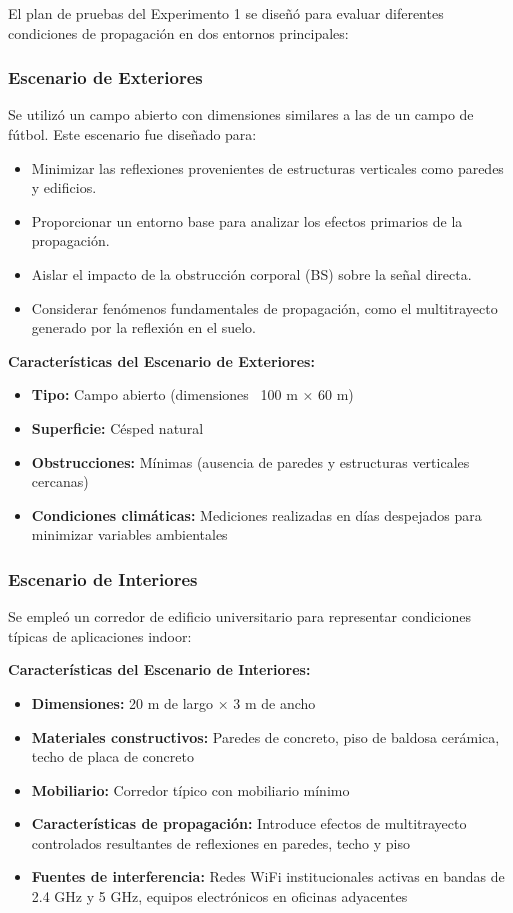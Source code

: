 El plan de pruebas del Experimento 1 se diseñó para evaluar diferentes condiciones de propagación en dos entornos principales:

\subsubsection{Escenario de Exteriores}

Se utilizó un campo abierto con dimensiones similares a las de un campo de fútbol. Este escenario fue diseñado para:

\begin{itemize}
\item Minimizar las reflexiones provenientes de estructuras verticales como paredes y edificios.
\item Proporcionar un entorno base para analizar los efectos primarios de la propagación.
\item Aislar el impacto de la obstrucción corporal (BS) sobre la señal directa.
\item Considerar fenómenos fundamentales de propagación, como el multitrayecto generado por la reflexión en el suelo.
\end{itemize}

\textbf{Características del Escenario de Exteriores:}
\begin{itemize}
\item \textbf{Tipo:} Campo abierto (dimensiones ~100 m × 60 m)
\item \textbf{Superficie:} Césped natural
\item \textbf{Obstrucciones:} Mínimas (ausencia de paredes y estructuras verticales cercanas)
\item \textbf{Condiciones climáticas:} Mediciones realizadas en días despejados para minimizar variables ambientales
\end{itemize}

\subsubsection{Escenario de Interiores}

Se empleó un corredor de edificio universitario para representar condiciones típicas de aplicaciones indoor:

\textbf{Características del Escenario de Interiores:}
\begin{itemize}
\item \textbf{Dimensiones:} 20 m de largo × 3 m de ancho
\item \textbf{Materiales constructivos:} Paredes de concreto, piso de baldosa cerámica, techo de placa de concreto
\item \textbf{Mobiliario:} Corredor típico con mobiliario mínimo
\item \textbf{Características de propagación:} Introduce efectos de multitrayecto controlados resultantes de reflexiones en paredes, techo y piso
\item \textbf{Fuentes de interferencia:} Redes WiFi institucionales activas en bandas de 2.4 GHz y 5 GHz, equipos electrónicos en oficinas adyacentes
\end{itemize}

